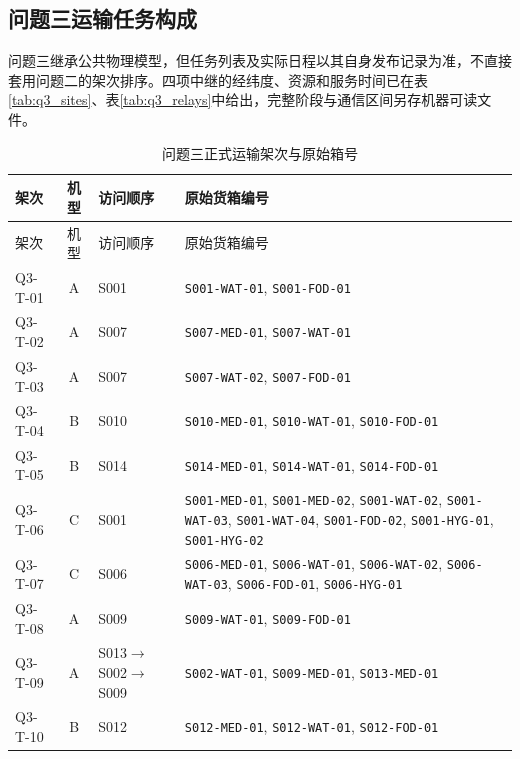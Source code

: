 \documentclass[withoutpreface,colorprint]{format}
\numberwithin{equation}{section}
\numberwithin{figure}{section}
\numberwithin{table}{section}
\begin{document}
\subsection{问题三运输任务构成}
问题三继承公共物理模型，但任务列表及实际日程以其自身发布记录为准，不直接套用问题二的架次排序。四项中继的经纬度、资源和服务时间已在表\ref{tab:q3_sites}、表\ref{tab:q3_relays}中给出，完整阶段与通信区间另存机器可读文件。

\begin{longtable}{@{}lc>{\raggedright\arraybackslash}p{2.8cm}>{\raggedright\arraybackslash}p{8.8cm}@{}}
\caption{问题三正式运输架次与原始箱号}\label{tab:app_q3_boxes}\\
\toprule
架次 & 机型 & 访问顺序 & 原始货箱编号\\
\midrule
\endfirsthead
\toprule
架次 & 机型 & 访问顺序 & 原始货箱编号\\
\midrule
\endhead
Q3-T-01 & A & S001 & \texttt{S001-WAT-01}\allowbreak, \texttt{S001-FOD-01}\allowbreak\\
Q3-T-02 & A & S007 & \texttt{S007-MED-01}\allowbreak, \texttt{S007-WAT-01}\allowbreak\\
Q3-T-03 & A & S007 & \texttt{S007-WAT-02}\allowbreak, \texttt{S007-FOD-01}\allowbreak\\
Q3-T-04 & B & S010 & \texttt{S010-MED-01}\allowbreak, \texttt{S010-WAT-01}\allowbreak, \texttt{S010-FOD-01}\allowbreak\\
Q3-T-05 & B & S014 & \texttt{S014-MED-01}\allowbreak, \texttt{S014-WAT-01}\allowbreak, \texttt{S014-FOD-01}\allowbreak\\
Q3-T-06 & C & S001 & \texttt{S001-MED-01}\allowbreak, \texttt{S001-MED-02}\allowbreak, \texttt{S001-WAT-02}\allowbreak, \texttt{S001-WAT-03}\allowbreak, \texttt{S001-WAT-04}\allowbreak, \texttt{S001-FOD-02}\allowbreak, \texttt{S001-HYG-01}\allowbreak, \texttt{S001-HYG-02}\allowbreak\\
Q3-T-07 & C & S006 & \texttt{S006-MED-01}\allowbreak, \texttt{S006-WAT-01}\allowbreak, \texttt{S006-WAT-02}\allowbreak, \texttt{S006-WAT-03}\allowbreak, \texttt{S006-FOD-01}\allowbreak, \texttt{S006-HYG-01}\allowbreak\\
Q3-T-08 & A & S009 & \texttt{S009-WAT-01}\allowbreak, \texttt{S009-FOD-01}\allowbreak\\
Q3-T-09 & A & S013$\to$S002$\to$S009 & \texttt{S002-WAT-01}\allowbreak, \texttt{S009-MED-01}\allowbreak, \texttt{S013-MED-01}\allowbreak\\
Q3-T-10 & B & S012 & \texttt{S012-MED-01}\allowbreak, \texttt{S012-WAT-01}\allowbreak, \texttt{S012-FOD-01}\allowbreak\\

\end{longtable}
\end{document}
